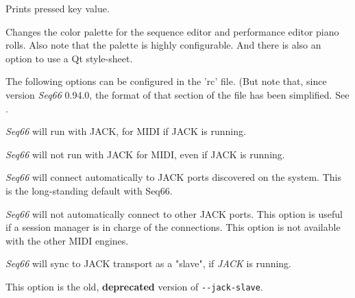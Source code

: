 
      Prints pressed key value.

      Changes the color palette for the sequence editor and performance editor
      piano rolls.  Also note that the palette is highly configurable.
      And there is also an option to use a Qt style-sheet.


   The following options can be configured in the 'rc' file. (But note that,
   since version \textsl{Seq66} 0.94.0, the format of that section of the file
   has been simplified.
   See .

      \textsl{Seq66} will run with JACK, for MIDI if JACK is running.


      \textsl{Seq66} will not run with JACK for MIDI, even if JACK is running.


      \textsl{Seq66} will connect automatically to JACK ports discovered on the
      system. This is the long-standing default with Seq66.


      \textsl{Seq66} will not automatically connect to other JACK ports.
      This option is useful if a session manager is in charge of the
      connections.
      This option is not available with the other MIDI engines.



      \textsl{Seq66} will sync to JACK transport as a "slave", if \textsl{JACK}
      is running.

      This option is the old, \textbf{deprecated} version of
      \texttt{-{}-jack-slave}.


